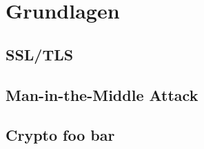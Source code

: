 \section{Grundlagen}
\newpage
\subsection{SSL/TLS}
\newpage
\subsection{Man-in-the-Middle Attack}
\newpage
\subsection{Crypto foo bar}
\newpage
